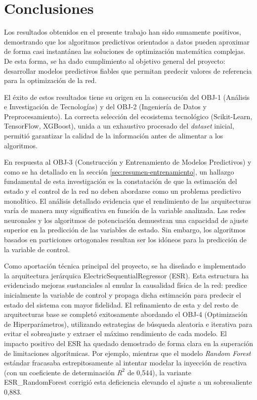 \chapter{Conclusiones}\label{cap:conclusiones}
Los resultados obtenidos en el presente trabajo han sido sumamente positivos, demostrando que los algoritmos predictivos orientados a datos pueden aproximar de forma casi instantánea las soluciones de optimización matemática complejas. De esta forma, se ha dado cumplimiento al objetivo general del proyecto: desarrollar modelos predictivos fiables que permitan predecir valores de referencia para la optimización de la red.

El éxito de estos resultados tiene su origen en la consecución del OBJ-1 (Análisis e Investigación de Tecnologías) y del OBJ-2 (Ingeniería de Datos y Preprocesamiento). La correcta selección del ecosistema tecnológico (Scikit-Learn, TensorFlow, XGBoost), unida a un exhaustivo procesado del \textit{dataset} inicial, permitió garantizar la calidad de la información antes de alimentar a los algoritmos.

En respuesta al OBJ-3 (Construcción y Entrenamiento de Modelos Predictivos) y como se ha detallado en la sección \ref{sec:resumen-entrenamiento}, un hallazgo fundamental de esta investigación es la constatación de que la estimación del estado y el control de la red no deben abordarse como un problema predictivo monolítico. El análisis detallado evidencia que el rendimiento de las arquitecturas varía de manera muy significativa en función de la variable analizada. Las redes neuronales y los algoritmos de potenciación demuestran una capacidad de ajuste superior en la predicción de las variables de estado. Sin embargo, los algoritmos basados en particiones ortogonales resultan ser los idóneos para la predicción de la variable de control.

Como aportación técnica principal del proyecto, se ha diseñado e implementado la arquitectura jerárquica ElectricSequentialRegressor (ESR). Esta estructura ha evidenciado mejoras sustanciales al emular la causalidad física de la red: predice inicialmente la variable de control y propaga dicha estimación para predecir el estado del sistema con mayor fidelidad. El refinamiento de esta y del resto de arquitecturas base se completó exitosamente abordando el OBJ-4 (Optimización de Hiperparámetros), utilizando estrategias de búsqueda aleatoria e iterativa para evitar el sobreajuste y extraer el máximo rendimiento de cada modelo. El impacto positivo del ESR ha quedado demostrado de forma clara en la superación de limitaciones algorítmicas. Por ejemplo, mientras que el modelo \textit{Random Forest} estándar fracasaba estrepitosamente al intentar modelar la inyección de reactiva (con un coeficiente de determinación $R^2$ de 0,544), la variante ESR\_RandomForest corrigió esta deficiencia elevando el ajuste a un sobresaliente 0,883. 

